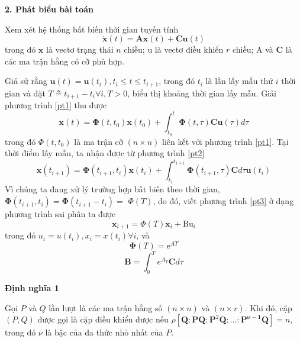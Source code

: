 \documentclass[12pt,a4paper]{article}
\begin{document}
\textbf{2. Phát biểu bài toán}

Xem xét hệ thống bất biến thời gian tuyến tính
\begin{equation}\tag{1}\label{pt1}
\dot{\mathbf{x}}(t)=\mathbf{A} \mathbf{x}(t)+\mathbf{C u}(t)
\end{equation}
trong đó $\mathbf{x}$ là vectơ trạng thái $n$ chiều; $\mathrm{u}$ là  vectơ điều khiển $r$ chiều; A và $\mathbf{C}$ là các ma trận hằng có cỡ phù hợp.

Giả sử rằng $\mathbf{u}(t)=\mathbf{u}\left(t_i\right), t_i \leqslant t \leqslant t_{i+1}$, trong đó $t_i$ là lần lấy mẫu thứ $i$ thời gian và đặt $T \triangleq t_{i+1}-t_i \forall i, T>0$, biểu thị khoảng thời gian lấy mẫu. Giải phương trình \eqref{pt1} thu được
\begin{equation}\tag{2}\label{pt2}
\mathbf{x}(t)=\boldsymbol{\Phi}\left(t, t_0\right) \mathbf{x}\left(t_0\right)+\int_{t_0}^t \boldsymbol{\Phi} (t, \tau) \mathbf{C u}(\tau) d \tau
\end{equation}
trong đó $\Phi\left(t, t_0\right)$ là ma trận cỡ $(n \times n)$ liên kết với phương trình \eqref{pt1}. Tại thời điểm lấy mẫu, ta nhận được từ phương trình \eqref{pt2}
\begin{equation}\tag{3}\label{pt3}
\mathbf{x}\left(t_{i+1}\right)=\boldsymbol{\Phi}\left(t_{i+1}, t_i\right) \mathbf{x}\left(t_i\right) +\int_{t_1}^{t_{1+1}} \boldsymbol{\Phi}\left(t_{i+1}, \tau\right) \mathbf{C} d \tau \mathbf{u}(t_i)
\end{equation}
Vì chúng ta đang xử lý trường hợp bất biến theo thời gian, $\boldsymbol{\Phi}\left(t_{i+1}, t_i\right)=\boldsymbol{\Phi}\left(t_{i+1}-t_i \right)=$ $\Phi(T)$, do đó, viết phương trình \eqref{pt3} ở dạng phương trình sai phân ta được
\begin{equation}\tag{4}\label{pt4}
\mathbf{x}_{i+1}=\Phi(T) \mathbf{x}_i+\mathrm{Bu}_i
\end{equation}
trong đó $u_i=u\left(t_i\right), x_i=x\left(t_i\right) \forall i$, và
\begin{equation}\tag{5}\label{pt5}
	\boldsymbol{\Phi}(T)=\mathrm{e}^{A T}
\end{equation}
\begin{equation}\tag{6}\label{pt6}
	\mathbf{B}=\int_0^T e^{A_T} \mathbf{C} d \tau
\end{equation}

\textbf{Định nghĩa 1}

Gọi $P$ và $Q$ lần lượt là các ma trận hằng số $(n \times n)$ và $(n \times r)$. Khi đó, cặp $(P, Q)$ được gọi là cặp điều khiển được nếu $\rho\left[\mathbf{Q}: \mathbf{P} \mathbf{Q}: \mathbf{P}^2 \mathbf{Q} : \ldots: \mathbf{P}^{\boldsymbol{\nu}-\mathbf{1}} \mathbf{Q}\right]=n$, trong đó $\nu$ là bậc của đa thức nhỏ nhất của $ P$.
\end{document}
